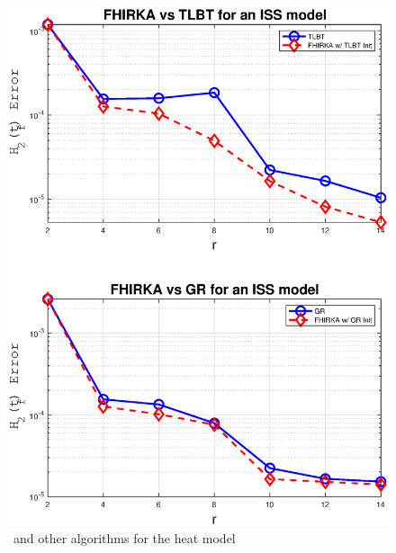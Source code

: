 \documentclass[twocolumn]{autart}
\begin{document}
 \begin{figure}[H]
 \centering
  \includegraphics [scale=0.35]{fig2i}
 \caption{\FH \ and other algorithms for the heat model \label{fig:iss}}
 \end{figure}
\end{document}
